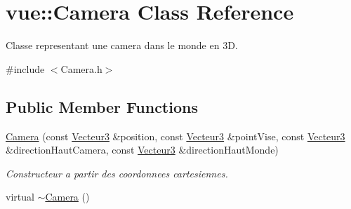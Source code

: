 \hypertarget{classvue_1_1_camera}{\section{vue\-:\-:Camera Class Reference}
\label{classvue_1_1_camera}
}


Classe representant une camera dans le monde en 3\-D.  




{\ttfamily \#include $<$Camera.\-h$>$}

\subsection*{Public Member Functions}
\begin{DoxyCompactItemize}
\item 
\hyperlink{classvue_1_1_camera_ab509d5c06a626fb3b1f6c588a5c85ce1}{Camera} (const \hyperlink{group__utilitaire_ga541aa4837ad9250d3a248dc82ee9ad4d}{Vecteur3} \&position, const \hyperlink{group__utilitaire_ga541aa4837ad9250d3a248dc82ee9ad4d}{Vecteur3} \&point\-Vise, const \hyperlink{group__utilitaire_ga541aa4837ad9250d3a248dc82ee9ad4d}{Vecteur3} \&direction\-Haut\-Camera, const \hyperlink{group__utilitaire_ga541aa4837ad9250d3a248dc82ee9ad4d}{Vecteur3} \&direction\-Haut\-Monde)
\begin{DoxyCompactList}\small\item\em Constructeur a partir des coordonnees cartesiennes. \end{DoxyCompactList}\item 
\hypertarget{classvue_1_1_camera_a173cf3a9d91b30cadd21d72149df4504}{virtual \hyperlink{classvue_1_1_camera_a173cf3a9d91b30cadd21d72149df4504}{$\sim$\-Camera} ()}\label{classvue_1_1_camera_a173cf3a9d91b30cadd21d72149df4504}


\end{DoxyCompactItemize}
